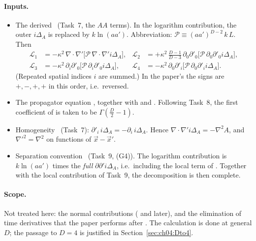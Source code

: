 \paragraph{Inputs.}
\begin{itemize}[leftmargin=1.2em,itemsep=3pt]
\item[(G1)] The derived  \tD\ (Task~7, the $AA$ terms).
In the logarithm contribution, the outer $i\Delta_A$ is replaced by $k\ln(aa')$.
Abbreviation: $\mathcal P\equiv(aa')^{D-2}\,k\,L$. Then
\begin{equation}
\begin{aligned}
\mathcal L_1&=-\kappa^2\,\nabla\!\cdot\!\nabla'\big[\mathcal P\,\nabla\!\cdot\!\nabla' i\Delta_A\big],&
\mathcal L_2&=+\kappa^2\,\frac{D-1}{D-3}\,\partial_0\partial'_0\big[\mathcal P\,\partial_0\partial'_0 i\Delta_A\big],\\
\mathcal L_3&=-\kappa^2\,\partial_i\partial'_0\big[\mathcal P\,\partial_i\partial'_0 i\Delta_A\big],&
\mathcal L_4&=-\kappa^2\,\partial_0\partial'_i\big[\mathcal P\,\partial_0\partial'_i i\Delta_A\big].
\end{aligned}
\label{eq:ch04:G1t10}
\end{equation}
(Repeated spatial indices $i$ are summed.)
In the paper's  the signs are $+,-,+,+$ in this order, i.e.\ reversed.
\item[(G2)] The propagator equation  \tP, together with  and  \tP.
Following Task~8, the first coefficient of  is taken to be $\Gamma(\frac D2-1)$.
\item[(G3)] Homogeneity \tD\ (Task~7): $\partial'_i\,i\Delta_A=-\partial_i\,i\Delta_A$.
Hence $\nabla\!\cdot\!\nabla' i\Delta_A=-\nabla^2A$, and $\nabla'^2=\nabla^2$ on functions of $\vec x-\vec x'$.
\item[(G4)] Separation convention \tP\ (Task~9, (G4)).
The logarithm contribution is $k\ln(aa')$ times the \emph{full} $\partial\partial' i\Delta_A$, i.e.\ including the local term of .
Together with the local contribution of Task~9, the decomposition is then complete.
\end{itemize}

\paragraph{Scope.}
Not treated here: the normal contributions ( and later), and the elimination of time derivatives that the paper performs after .
The calculation is done at general $D$; the passage to $D=4$ is justified in Section~\ref{sec:ch04:Dto4}.

